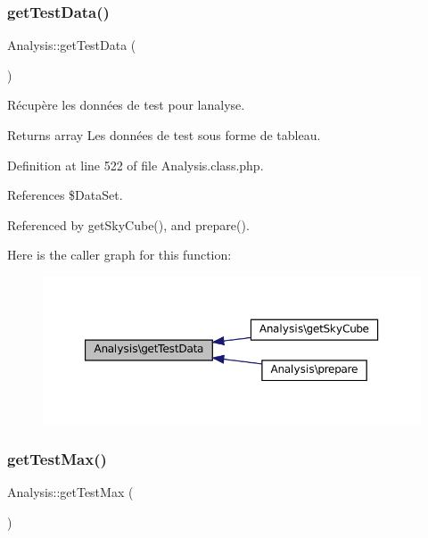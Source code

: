 \subsubsection{\texorpdfstring{get\+Test\+Data()}{getTestData()}\hspace{0.1cm}{\footnotesize\ttfamily [2/2]}}
{\footnotesize\ttfamily Analysis\+::get\+Test\+Data (\begin{DoxyParamCaption}{ }\end{DoxyParamCaption})\hspace{0.3cm}{\ttfamily [protected]}}

Récupère les données de test pour l\textquotesingle{}analyse.

\begin{DoxyReturn}{Returns}
array Les données de test sous forme de tableau. 
\end{DoxyReturn}


Definition at line 522 of file Analysis.\+class.\+php.



References \$\+Data\+Set.



Referenced by get\+Sky\+Cube(), and prepare().

Here is the caller graph for this function\+:\nopagebreak
\begin{figure}[H]
\begin{center}
\leavevmode
\includegraphics[width=350pt]{class_analysis_a03e4f465ff77ad240a13f25de5c559b3_icgraph}
\end{center}
\end{figure}
\mbox{\label{class_analysis_aa62e20d065337e6c23e2840e02235b69}} 
\subsubsection{\texorpdfstring{get\+Test\+Max()}{getTestMax()}}
{\footnotesize\ttfamily Analysis\+::get\+Test\+Max (\begin{DoxyParamCaption}{ }\end{DoxyParamCaption})\hspace{0.3cm}{\ttfamily [protected]}}

